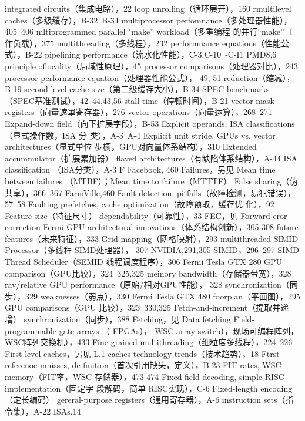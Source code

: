 integrated circuits（集成电路），22
loop unrolling（循环展开），160
rmultilevel caches（多级缓存），B-32~B-34
multiprocessor perfomnance（多处理器性能），405~406
mltiprogrammed parallel "make” workload（多重编程
的并行“make” 工作负载），375
multitbreading（多线程），232
performnance equations（性能公式），B-22
pipelining performance（流水化性能），C-3,C-10~-C-I1
PMD8,6
principle oflocality（局域性原理），45
processor comparisons（处理器对比），243
processor performance equation（处理器性能公式），
49, 51
reduction（缩减），B-19
second-level cache size（第二级缓存大小），B-34
SPEC benchmarks （SPEC基准测试），42~44,43,56
stall time（停顿时间），B-21
vector mask registers（向量遮單寄存器），276
vector operations（向量运算），268~271
Expand-down field（向下扩展字段），B-53
Explicit operands, ISA classifications（显式操作数，ISA 分
类），A-3~A-4
Explicit unit stride, GPUs vs. vector architectures（显式单位
步橱，GPU对向量体系结构），310
Extended accummulator（扩展累加器）
flaved architectures（有缺陷体系结构），A-44
ISA classification （ISA分类），A-3
F
Facebook, 460
Failures，另见 Mean time between failures （MTBF）；Mean
time to failure（MTTTF）
False sharing（伪共享），366~367
FarmVille,460
Fault detection, pitfalls（故障检测，易犯错误），57~58
Faulting prefetches, cache optimization（故障预取，缓存优
化），92
Feature size（特征尺寸）
dependability（可靠性），33
FEC，见 Forward eror correction
Fermi GPU
architectural innovations（体系结构创新），305-308
future features（未来特征），333
Grid mapping（网格映射），293
multithreaded SIMID Processor（多线程 SIMD处理器），
307
NVIDIA,291,305
SIMID，296~297
SIMD Thread Scheduler（SEMID 线程调度程序），306
Fermi Tesla GTX 280
GPU comparison（GPU比较），324~325,325
meinory bandwidth（存储器带宽），328
rav/relative GPU performance（原始/相对GPU性能），
328
synchronization（同步），329
weaknesses（弱点），330
Fermi Tesla GTX 480
foorplan（平面图），295
GPU comparisons（GPU 比较），323~330,325
Fetch-and-increment（提取并递增）
synchronization（同步），388
Fetching，见 Data fetching
Field-programmable gate arrays （ FPGAs）， WSC array
switch），现场可编程阵列，WSC阵列交換机），433
Fine-grained multithreading（细粒度多线程），224~226
First-level caches，另见 L.1 caches
technology trends（技术趋势），18
Ftrst-referenoe mnisses, de finition（首次引用缺失，定义），B-23
FIT rates, WSC memory（FIT率，WSC 存储器），473-474
Fixed-field decoding, simple RISC implementation（固定字
段解码，简单 RISC实现），C-6
Fixed-length encoding（定长编码）
gereral-purpose registers（通用寄存器），A-6
instruction sets（指令集），A-22
ISAs,14
